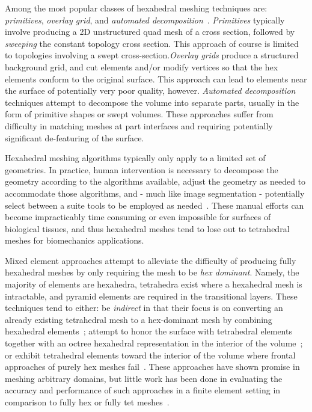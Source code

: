 Among the most popular classes of hexahedral meshing techniques are: \textit{primitives}, \textit{overlay grid}, and \textit{automated decomposition}~\cite{blacker_2001}. \textit{Primitives} typically involve producing a 2D unstructured quad mesh of a cross section, followed by \textit{sweeping} the constant topology cross section. This approach of course is limited to topologies involving a swept cross-section.\textit{Overlay grids} produce a structured background grid, and cut elements and/or modify vertices so that the hex elements conform to the original surface. This approach can lead to elements near the surface of potentially very poor quality, however. \textit{Automated decomposition} techniques attempt to decompose the volume into separate parts, usually in the form of primitive shapes or swept volumes. These approaches suffer from difficulty in matching meshes at part interfaces and requiring potentially significant de-featuring of the surface.

Hexahedral meshing algorithms typically only apply to a limited set of geometries. In practice, human intervention is necessary to decompose the geometry according to the algorithms available, adjust the geometry as needed to accommodate those algorithms, and - much like image segmentation - potentially select between a suite tools to be employed as needed~\cite{blacker_2001}. These manual efforts can become impracticably time consuming or even impossible for surfaces of biological tissues, and thus hexahedral meshes tend to lose out to tetrahedral meshes for biomechanics applications.

Mixed element approaches attempt to alleviate the difficulty of producing fully hexahedral meshes by only requiring the mesh to be \textit{hex dominant}. Namely, the majority of elements are hexahedra, tetrahedra exist where a hexahedral mesh is intractable, and pyramid elements are required in the transitional layers. These techniques tend to either: be \textit{indirect} in that their focus is on converting an already existing tetrahedral mesh to a hex-dominant mesh by combining hexahedral elements~\cite{baudouin_2014, gao_2017}; attempt to honor the surface with tetrahedral elements together with an octree hexahedral representation in the interior of the volume~\cite{young_2008, lobos_2015}; or exhibit tetrahedral elements toward the interior of the volume where frontal approaches of purely hex meshes fail~\cite{blacker_2001}. These approaches have shown promise in meshing arbitrary domains, but little work has been done in evaluating the accuracy and performance of such approaches in a finite element setting in comparison to fully hex or fully tet meshes~\cite{tautges_2001}.

